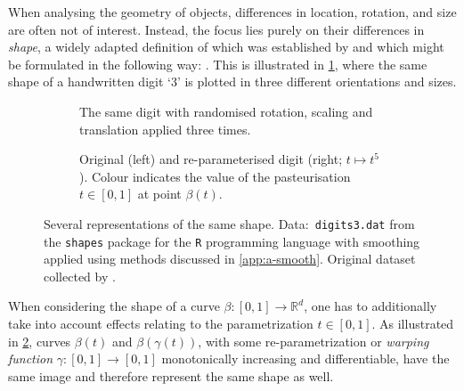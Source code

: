 When analysing the geometry of objects, differences in location, rotation, and size are often not of interest.
Instead, the focus lies purely on their differences in  \textit{shape}, a widely adapted definition of which was established by \cite{Kendall1977} and which might be formulated in the following way: .
This is illustrated in \cref{fig:1-eucl}, where the same shape of a handwritten digit \enquote*{3} is plotted in three different orientations and sizes.
\begin{figure}
  \centering
  \begin{subfigure}{.48\textwidth}
    \centering
    \caption{The same digit with randomised rotation, scaling and translation applied three times.\\}
    \label{fig:1-eucl}
  \end{subfigure}\hfill%
  \begin{subfigure}{.48\textwidth}
    \centering
    \caption{Original (left) and re-parameterised digit (right; $t \mapsto t^5$). Colour indicates the value of the pasteurisation $t \in [0,1]$ at point $\beta(t)$.}
    \label{fig:1-warp}
  \end{subfigure}
  \caption{Several representations of the same shape. Data:\ \texttt{digits3.dat} from the \texttt{shapes} package \parencite{shapes} for the \texttt{R} programming language \parencite{R} with smoothing applied using methods discussed in \cref{app:a-smooth}. Original dataset collected by \cite{Anderson1997}.}
  \label{fig:1-shape}
\end{figure}
When considering the shape of a curve $\beta : [0,1] \rightarrow \mathbb{R}^d$, one has to additionally take into account effects relating to the parametrization $t \in [0,1]$.
As illustrated in \cref{fig:1-warp}, curves $\beta(t)$ and $\beta(\gamma(t))$, with some re-parametrization or \textit{warping function} $\gamma : [0,1] \rightarrow [0,1]$ monotonically increasing and differentiable, have the same image and therefore represent the same shape as well.

